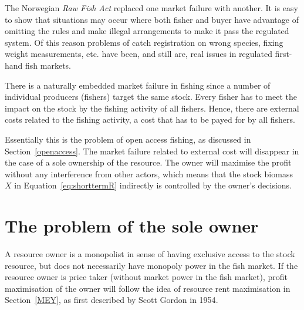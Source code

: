 \documentclass[11pt,fleqn]{book} %
\begin{document}
\begin{corollary}
{The Norwegian \textit{Raw Fish Act} replaced one market failure with another. It is easy to show that situations may occur where both fisher and buyer have advantage of omitting the rules and make illegal arrangements to make it pass the regulated system. Of this reason problems of catch registration on wrong species, fixing weight measurements, etc. have been, and still are, real issues in regulated first-hand fish markets.}
\end{corollary}

There is a naturally embedded market failure in fishing since a number of individual producers (fishers) target the same stock. Every fisher has to meet the impact on the stock by the fishing activity of all fishers. Hence, there are external costs related to the fishing activity, a cost that has to be payed for by all fishers. 

Essentially this is the problem of open access fishing, as discussed in Section~\ref{openaccess}. The market failure related to external cost will disappear in the case of a sole ownership of the resource. The owner will maximise the profit without any interference from other actors, which means that the stock biomass $X$ in Equation~\ref{eq:shorttermR} indirectly is controlled by the owner's decisions.

\section{The problem of the sole owner}\label{sole owner}
A resource owner is a monopolist in sense of having exclusive access to the stock resource, but does not necessarily have monopoly power in the fish market. If the resource owner is price taker (without market power in the fish market), profit maximisation of the owner will follow the idea of resource rent maximisation in Section~\ref{MEY}, as first described by Scott Gordon in 1954\cite{Gordon1954}.
\end{document}
